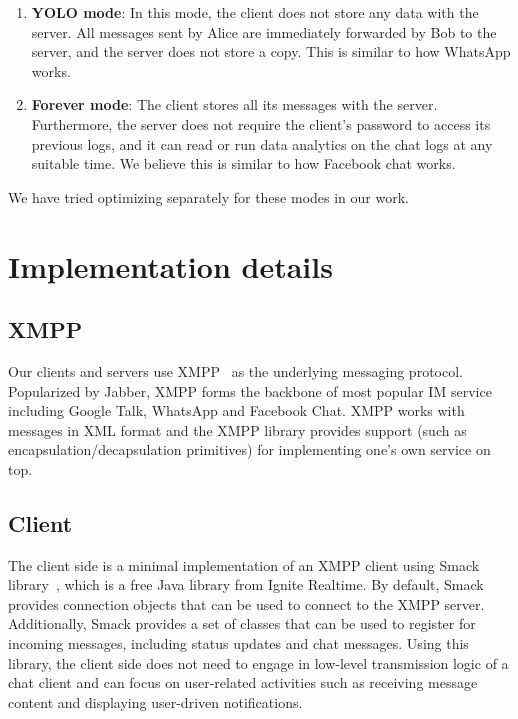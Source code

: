 \documentclass[a4paper, twocolumn]{article}
\begin{document}
\begin{enumerate}
\item \textbf{YOLO mode}: In this mode, the client does not store any data with the server. All messages sent by Alice are immediately forwarded by Bob to the server, and the server does not store a copy. This is similar to how WhatsApp works. 

\item \textbf{Forever mode}: The client stores all its messages with the server. Furthermore, the server does not require the client’s password to access its previous logs, and it can read or run data analytics on the chat logs at any suitable time. We believe this is similar to how Facebook chat works. 
\end{enumerate}
We have tried optimizing separately for these modes in our work. 


\section{Implementation details}
\subsection{XMPP}
Our clients and servers use XMPP~\cite{xmpp} as the underlying messaging protocol. Popularized by Jabber, XMPP forms the backbone of most popular IM service including Google Talk, WhatsApp and Facebook Chat. XMPP works with messages in XML format and the XMPP library provides support (such as encapsulation/decapsulation primitives) for implementing one's own service on top. 

\subsection{Client}
The client side is a minimal implementation of an XMPP client using Smack library~\cite{smack}, which is a free Java library from Ignite Realtime. By default, Smack provides connection objects that can be used to connect to the XMPP server.  Additionally, Smack provides a set of classes that can be used to register for incoming messages, including status updates and chat messages. Using this library, the client side does not need to engage in low-level transmission logic of a chat client and can focus on user-related activities such as receiving message content and displaying user-driven notifications.
\end{document}
